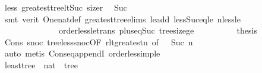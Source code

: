 \begin{isabellebody}
\ less{\isacharparenleft}{\kern0pt}{}{\isacharparenright}{\kern0pt}\ greatest{\isacharunderscore}{\kern0pt}tree{\isacharunderscore}{\kern0pt}lt{\isacharunderscore}{\kern0pt}Suc\ size{\isacharunderscore}{\kern0pt}r{}\ \isamarkupfalse%
\ Suc\isanewline
\ \ \ \ \ \ \ \ \ \ \isamarkupfalse%
\ {\isacharparenleft}{\kern0pt}smt\ {\isacharparenleft}{\kern0pt}verit{\isacharparenright}{\kern0pt}\ One{\isacharunderscore}{\kern0pt}nat{\isacharunderscore}{\kern0pt}def\ greatest{\isacharunderscore}{\kern0pt}tree{\isachardot}{\kern0pt}elims\ le{\isacharunderscore}{\kern0pt}add{}\ less{\isacharunderscore}{\kern0pt}Suc{\isacharunderscore}{\kern0pt}eq{\isacharunderscore}{\kern0pt}le\ nless{\isacharunderscore}{\kern0pt}le\isanewline
\ \ \ \ \ \ \ \ \ \ \ \ \ \ order{\isacharunderscore}{\kern0pt}less{\isacharunderscore}{\kern0pt}le{\isacharunderscore}{\kern0pt}trans\ plus{\isacharunderscore}{\kern0pt}{}{\isacharunderscore}{\kern0pt}eq{\isacharunderscore}{\kern0pt}Suc\ tree{\isacharunderscore}{\kern0pt}size{\isacharunderscore}{\kern0pt}ge{\isacharunderscore}{\kern0pt}{}{\isacharparenright}{\kern0pt}\isanewline
\ \ \ \ \ \ \ \ \isamarkupfalse%
\ {\isacharquery}{\kern0pt}thesis\ \isamarkupfalse%
\ Cons\ snoc\ tree{\isacharunderscore}{\kern0pt}less{\isacharunderscore}{\kern0pt}snoc{}{\isacharbrackleft}{\kern0pt}OF\ r{}{\isacharunderscore}{\kern0pt}lt{\isacharunderscore}{\kern0pt}greatest{\isacharunderscore}{\kern0pt}n{\isacharprime}{\kern0pt}{\isacharcomma}{\kern0pt}\ of\ {\isacharunderscore}{\kern0pt}\ {\isachardoublequoteopen}{\isacharbrackleft}{\kern0pt}{\isacharbrackright}{\kern0pt}{\isachardoublequoteclose}{\isacharbrackright}{\kern0pt}\ Suc\ n{\isacharprime}{\kern0pt}{\isacharprime}{\kern0pt}\isanewline
\ \ \ \ \ \ \ \ \ \ \isamarkupfalse%
\ {\isacharparenleft}{\kern0pt}auto{\isacharcomma}{\kern0pt}\ metis\ Cons{\isacharunderscore}{\kern0pt}eq{\isacharunderscore}{\kern0pt}appendI\ order{\isacharunderscore}{\kern0pt}less{\isacharunderscore}{\kern0pt}imp{\isacharunderscore}{\kern0pt}le{\isacharparenright}{\kern0pt}\isanewline
\ \ \ \ \ \ \isamarkupfalse%
\isanewline
\ \ \ \ \isamarkupfalse%
\isanewline
\ \ \isamarkupfalse%
\isanewline
{}\isamarkupfalse%
%
\endisatagproof
{\isafoldproof}%
%
\isadelimproof
\isanewline
%
\endisadelimproof
\isanewline
{}\isamarkupfalse%
\ least{\isacharunderscore}{\kern0pt}tree\ {\isacharcolon}{\kern0pt}{\isacharcolon}{\kern0pt}\ {\isachardoublequoteopen}nat\ {\isasymRightarrow}\ tree{\isachardoublequoteclose}\ \isanewline

\end{isabellebody}
